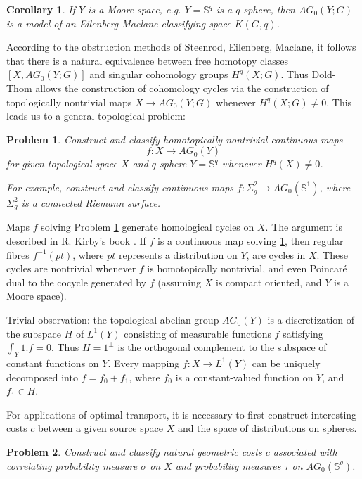 \documentclass[12pt]{amsart}
\newtheorem{prob}{Problem}
\newtheorem*{cor}{Corollary}
\theoremstyle{remark}
\begin{document}
\begin{cor}
If $Y$ is a Moore space, e.g. $Y=\mathbb{S}^q$ is a $q$-sphere, then $AG_0(Y;G)$ is a model of an Eilenberg-Maclane classifying space $K(G,q)$.
\end{cor}

According to the obstruction methods of Steenrod, Eilenberg, Maclane, it follows that there is a natural equivalence between free homotopy classes $[X, AG_0(Y;G)]$ and singular cohomology groups $H^q(X;G)$. Thus Dold-Thom allows the construction of cohomology cycles via the construction of topologically nontrivial maps $X\to AG_0(Y;G)$ whenever $H^q(X;G)\neq 0$. This leads us to a general topological problem: 

\begin{prob}
\label{dt1}
Construct and classify homotopically nontrivial continuous maps $$f: X \to AG_0(Y)$$ for given topological space $X$ and $q$-sphere $Y=\mathbb{S}^q$ whenever $H^q(X)\neq 0$. 

For example, construct and classify continuous maps $f: \Sigma^2_g \to AG_0(\mathbb{S}^1)$, where $\Sigma_g^2$ is a connected Riemann surface.
\end{prob}

Maps $f$ solving Problem \ref{dt1} generate homological cycles on $X$. The argument is described in R. Kirby's book \cite{kirby}. If $f$ is a continuous map solving \ref{dt1}, then regular fibres $f^{-1}(pt)$, where $pt$ represents a distribution on $Y$, are cycles in $X$. These cycles are nontrivial whenever $f$ is homotopically nontrivial, and even Poincar\'e dual to the cocycle generated by $f$ (assuming $X$ is compact oriented, and $Y$ is a Moore space).


Trivial observation: the topological abelian group $AG_0(Y)$ is a discretization of the subspace $H$ of $L^1(Y)$ consisting of measurable functions $f$ satisfying $\int_Y 1. f=0$. Thus $H=1^{\perp}$ is the orthogonal complement to the subspace of constant functions on $Y$. Every mapping $f: X\to L^1(Y)$ can be uniquely decomposed into $f=f_0+f_1$, where $f_0$ is a constant-valued function on $Y$, and $f_1\in H$. 

For applications of optimal transport, it is necessary to first construct interesting costs $c$ between a given source space $X$ and the space of distributions on spheres. 

\begin{prob} 
Construct and classify natural geometric costs $c$ associated with correlating probability measure $\sigma$ on $X$ and probability measures $\tau$ on $AG_0(\mathbb{S}^q)$.

\end{prob}
\end{document}
